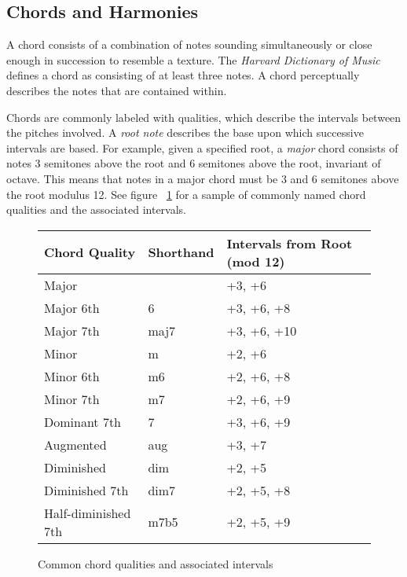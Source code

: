 \subsection{Chords and Harmonies}

A chord consists of a combination of notes sounding simultaneously or close enough in succession to resemble a texture. The \textit{Harvard Dictionary of Music} defines a chord as consisting of at least three notes\cite{harvdict}. A chord perceptually describes the notes that are contained within.

Chords are commonly labeled with qualities, which describe the intervals between the pitches involved. A \textit{root note} describes the base upon which successive intervals are based. For example, given a specified root, a \textit{major} chord consists of notes 3 semitones above the root and 6 semitones above the root, invariant of octave. This means that notes in a major chord must be 3 and 6 semitones above the root modulus 12. See figure ~\ref{fig:qualitytable} for a sample of commonly named chord qualities and the associated intervals.

\begin{figure}[h!]
\begin{center}
\begin{tabular}{lll}
\toprule
Chord Quality       & Shorthand & Intervals from Root (mod 12) \\
\midrule
Major               &           & +3, +6     \\
Major 6th           & 6         & +3, +6, +8 \\
Major 7th           & maj7      & +3, +6, +10\\
Minor               & m         & +2, +6     \\
Minor 6th           & m6        & +2, +6, +8 \\
Minor 7th           & m7        & +2, +6, +9 \\
Dominant 7th        & 7         & +3, +6, +9 \\
Augmented           & aug       & +3, +7     \\
Diminished          & dim       & +2, +5     \\
Diminished 7th      & dim7      & +2, +5, +8 \\
Half-diminished 7th & m7b5      & +2, +5, +9 \\
\bottomrule
\end{tabular}
\caption{Common chord qualities and associated intervals}
\label{fig:qualitytable}
\end{center}
\end{figure}

